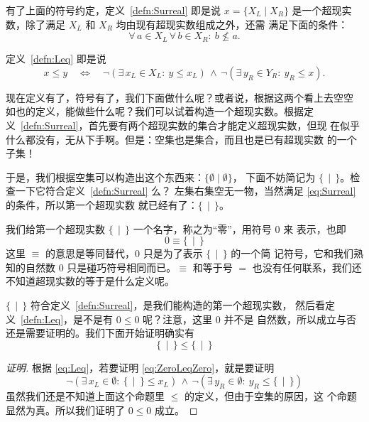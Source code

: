 \documentclass[cs4size,a4paper,adobefonts]{ctexart}
\numberwithin{equation}{section}
\begin{document}
有了上面的符号约定，定义~\ref{defn:Surreal} 即是说 $x=\{X_L \mid X_R\}$
是一个超现实数，除了满足 $X_L$ 和 $X_R$ 均由现有超现实数组成之外，还需
满足下面的条件：
\begin{equation}
  \label{eq:Surreal}
  \forall\, a \in X_L \,\forall\, b \in X_R:\: b\nleq a.
\end{equation}

定义~\ref{defn:Leq} 即是说
\begin{equation}
  \label{eq:Leq}
  x \leq y \quad\Leftrightarrow\quad
  \neg(\exists\, x_L \in X_L :\: y \leq x_L)\, \wedge \,
  \neg(\exists\, y_R \in Y_R :\: y_R \leq x).
\end{equation}

现在定义有了，符号有了，我们下面做什么呢？或者说，根据这两个看上去空空
如也的定义，能做些什么呢？我们可以试着构造一个超现实数。根据定
义~\ref{defn:Surreal}，首先要有两个超现实数的集合才能定义超现实数，但现
在似乎什么都没有，无从下手啊。但是：空集也是集合，而且也是已有超现实数
的一个子集！

于是，我们根据空集可以构造出这个东西来：$\{\emptyset\mid\emptyset\}$，
下面不妨简记为 $\{\,\mid\,\}$。检查一下它符合定义~\ref{defn:Surreal} 么？
左集右集空无一物，当然满足 \eqref{eq:Surreal} 的条件，所以第一个超现实数
就已经有了：$\{\,\mid\,\}$。

我们给第一个超现实数 $\{\,\mid\,\}$ 一个名字，称之为“零”，用符号 $0$ 来
表示，也即
\begin{equation}
  0 \equiv \{\,\mid\,\}
\end{equation}
这里 $\equiv$ 的意思是等同替代，0 只是为了表示 $\{\,\mid\,\}$ 的一个简
记符号，它和我们熟知的自然数 0 只是碰巧符号相同而已。$\equiv$ 和等于号
$=$ 也没有任何联系，我们还不知道超现实数的等于是什么定义呢。

$\{\,\mid\,\}$ 符合定义~\ref{defn:Surreal}，是我们能构造的第一个超现实数，
然后看定义~\ref{defn:Leq}，是不是有 $0 \leq 0$ 呢？注意，这里 $0$ 并不是
自然数，所以成立与否还是需要证明的。我们下面开始证明确实有
\begin{equation}
  \label{eq:ZeroLeqZero}
  \{\,\mid\,\}\leq\{\,\mid\,\}
\end{equation}

\begin{proof}[证明]
  根据 \eqref{eq:Leq}，若要证明 \eqref{eq:ZeroLeqZero}，就是要证明
  \[
  \neg(\exists\,x_L\in\emptyset:\:\{\,\mid\,\}\leq x_L)\,\wedge\,
  \neg(\exists\,y_R\in\emptyset:\:y_R\leq\{\,\mid\,\})
  \]
  虽然我们还是不知道上面这个命题里 $\leq$ 的定义，但由于空集的原因，这
  个命题显然为真。所以我们证明了 $0\leq0$ 成立。
\end{proof}
\end{document}
